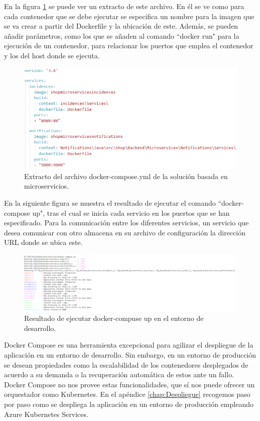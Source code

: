 \documentclass[11pt,spanish,listoffigures]{tfgetsinf}
\begin{document}
En la figura \ref{fig:Compose} se puede ver un extracto de este archivo. En él se ve como para cada contenedor que se debe ejecutar se especifica un nombre para la imagen que se va crear a partir del Dockerfile y la ubicación de este. Además, se pueden añadir parámetros, como los que se añaden al comando ``docker run" para la ejecución de un contenedor, para relacionar los puertos que emplea el contenedor y los del host donde se ejecuta.

\begin{figure}[h]
\centering
\includegraphics[scale=0.6]{Compose}
\caption{Extracto del archivo docker-compose.yml de la solución basada en microservicios.}
\label{fig:Compose}
\end{figure}

\newpage


En la siguiente figura se muestra el resultado de ejecutar el comando ``docker-compose up", tras el cual se inicia cada servicio en los puertos que se han especificado. Para la comunicación entre los diferentes servicios, un servicio que desea comunicar con otro almacena en su archivo de configuración la dirección URL donde se ubica este.

\begin{figure}[h]
\centering
\includegraphics[scale=0.4]{docker-compose-up}
\caption{Resultado de ejecutar docker-compuse up en el entorno de desarrollo.}
\end{figure}

Docker Compose es una herramienta excepcional para agilizar el despliegue de la aplicación en un entorno de desarrollo. Sin embargo, en un entorno de producción se desean propiedades como la escalabilidad de los contenedores desplegados de acuerdo a su demanda o la recuperación automática de estos ante un fallo. Docker Compose no nos provee estas funcionalidades, que sí nos puede ofrecer un orquestador como Kubernetes. En el apéndice \ref{chap:Despliegue}  recogemos paso por paso como se despliega la aplicación en un entorno de producción empleando Azure Kubernetes Services.
\end{document}
